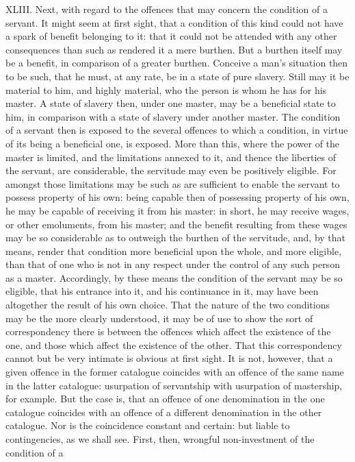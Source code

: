 \documentclass[12pt]{report}
\begin{document}
XLIII. Next, with regard to the offences that may concern the condition
of a servant. It might seem at first sight, that a condition of this
kind could not have a spark of benefit belonging to it: that it could
not be attended with any other consequences than such as rendered it a
mere burthen. But a burthen itself may be a benefit, in comparison of a
greater burthen. Conceive a man's situation then to be such, that he
must, at any rate, be in a state of pure slavery. Still may it be
material to him, and highly material, who the person is whom he has for
his master. A state of slavery then, under one master, may be a
beneficial state to him, in comparison with a state of slavery under
another master. The condition of a servant then is exposed to the
several offences to which a condition, in virtue of its being a
beneficial one, is exposed. More than this, where the power of the
master is limited, and the limitations annexed to it, and thence the
liberties of the servant, are considerable, the servitude may even be
positively eligible. For amongst those limitations may be such as are
sufficient to enable the servant to possess property of his own: being
capable then of possessing property of his own, he may be capable of
receiving it from his master: in short, he may receive wages, or other
emoluments, from his master; and the benefit resulting from these wages
may be so considerable as to outweigh the burthen of the servitude, and,
by that means, render that condition more beneficial upon the whole, and
more eligible, than that of one who is not in any respect under the
control of any such person as a master. Accordingly, by these means the
condition of the servant may be so eligible, that his entrance into it,
and his continuance in it, may have been altogether the result of his
own choice. That the nature of the two conditions may be the more
clearly understood, it may be of use to show the sort of correspondency
there is between the offences which affect the existence of the one, and
those which affect the existence of the other. That this correspondency
cannot but be very intimate is obvious at first sight. It is not,
however, that a given offence in the former catalogue coincides with an
offence of the same name in the latter catalogue: usurpation of
servantship with usurpation of mastership, for example. But the case is,
that an offence of one denomination in the one catalogue coincides with
an offence of a different denomination in the other catalogue. Nor is
the coincidence constant and certain: but liable to contingencies, as we
shall see. First, then, wrongful non-investment of the condition of a
\end{document}
